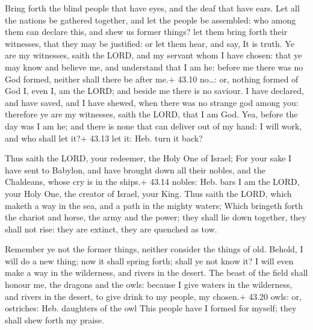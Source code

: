  Bring forth the blind people that have eyes, and the deaf
that have ears.  Let all the nations be gathered together,
and let the people be assembled: who among them can declare this, and
shew us former things? let them bring forth their witnesses, that they
may be justified: or let them hear, and say, It is truth. 
Ye are my witnesses, saith the LORD, and my servant whom I have chosen:
that ye may know and believe me, and understand that I am he: before me
there was no God formed, neither shall there be after me.+ 43.10
no\ldots: or, nothing formed of God  I, even I, am the
LORD; and beside me there is no saviour.  I have declared,
and have saved, and I have shewed, when there was no strange god among
you: therefore ye are my witnesses, saith the LORD, that I am God.
 Yea, before the day was I am he; and there is none that
can deliver out of my hand: I will work, and who shall let it?+ 43.13
let it: Heb. turn it back?

 Thus saith the LORD, your redeemer, the Holy One of
Israel; For your sake I have sent to Babylon, and have brought down all
their nobles, and the Chaldeans, whose cry is in the ships.+ 43.14
nobles: Heb. bars  I am the LORD, your Holy One, the
creator of Israel, your King.  Thus saith the LORD, which
maketh a way in the sea, and a path in the mighty waters; 
Which bringeth forth the chariot and horse, the army and the power; they
shall lie down together, they shall not rise: they are extinct, they are
quenched as tow.

 Remember ye not the former things, neither consider the
things of old.  Behold, I will do a new thing; now it shall
spring forth; shall ye not know it? I will even make a way in the
wilderness, and rivers in the desert.  The beast of the
field shall honour me, the dragons and the owls: because I give waters
in the wilderness, and rivers in the desert, to give drink to my people,
my chosen.+ 43.20 owls: or, ostriches: Heb. daughters of the owl
 This people have I formed for myself; they shall shew
forth my praise.

